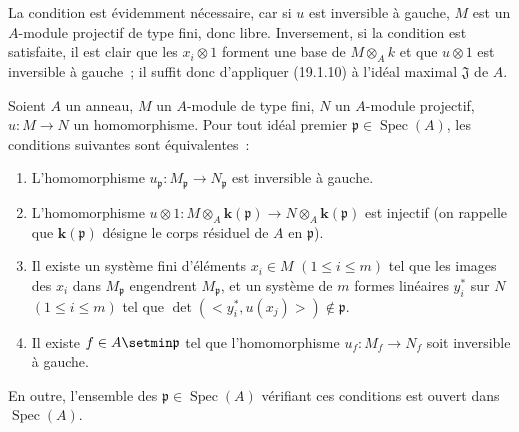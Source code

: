 La condition est évidemment nécessaire, car si $u$ est inversible à gauche,
$M$ est un $A$-module projectif de type fini, donc libre. Inversement, si la
condition est satisfaite, il est clair que les $x_i\otimes1$ forment une base
de $M\otimes_Ak$ et que $u\otimes1$ est inversible à gauche~; il suffit donc
d'appliquer (19.1.10) à l'idéal maximal $\mathfrak J$ de $A$.

\begin{corollary}[19.1.12]
\label{0.19.1.12-fr}
Soient $A$ un anneau, $M$ un $A$-module de type fini, $N$ un $A$-module
projectif, $u:M\to N$ un homomorphisme. Pour tout idéal premier
$\mathfrak p\in\operatorname{Spec}(A)$, les conditions suivantes sont
équivalentes~:
\begin{enumerate}
  \item[\textup{a)}] L'homomorphisme
  $u_{\mathfrak p}:M_{\mathfrak p}\to N_{\mathfrak p}$ est inversible à
  gauche.
  \item[\textup{b)}] L'homomorphisme
  $u\otimes1:M\otimes_A\boldsymbol{k}(\mathfrak p)\to N\otimes_A\boldsymbol{k}(\mathfrak p)$ est
  injectif \textup{(on rappelle que $\boldsymbol{k}(\mathfrak p)$ désigne le corps résiduel de $A$
  en $\mathfrak p$)}.
  \item[\textup{c)}] Il existe un système fini d'éléments $x_i\in M$
  $(1\leq i\leq m)$ tel que les images des $x_i$ dans $M_{\mathfrak p}$
  engendrent $M_{\mathfrak p}$, et un système de $m$ formes linéaires
  $y_i^*$ sur $N$ $(1\leq i\leq m)$ tel que
  $\det(\mathopen{<}y_i^*,u(x_j)\mathclose{>})\notin\mathfrak p$.
  \item[\textup{d)}] Il existe $f\in A\setmin\mathfrak p$ tel que l'homomorphisme
  $u_f:M_f\to N_f$ soit inversible à gauche.
\end{enumerate}

En outre, l'ensemble des $\mathfrak p\in\operatorname{Spec}(A)$ vérifiant ces
conditions est ouvert dans $\operatorname{Spec}(A)$.
\end{corollary}

